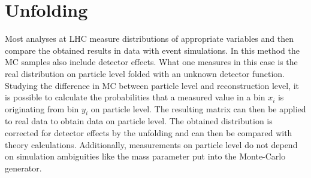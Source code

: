 \chapter{Unfolding}
\label{ch:unfolding}
	Most analyses at LHC measure distributions of appropriate variables and then compare the obtained results in data with event simulations. In this method the MC samples also include detector effects. What one measures in this case is the real distribution on particle level folded with an unknown detector function. Studying the difference in MC between particle level and reconstruction level, it is possible to calculate the probabilities that a measured value in a bin $x_i$ is originating from bin $y_i$ on particle level. The resulting matrix can then be applied to real data to obtain data on particle level. The obtained distribution is corrected for detector effects by the unfolding and can then be compared with theory calculations. Additionally, measurements on particle level do not depend on simulation ambiguities like the mass parameter put into the Monte-Carlo generator.
